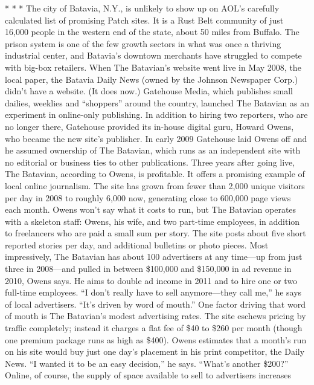 * * *
The city of Batavia, N.Y., is unlikely to show up on AOL's carefully calculated
list of promising Patch sites. It is a Rust Belt community of just 16,000 people in
the western end of the state, about 50 miles from Buffalo. The prison system is
one of the few growth sectors in what was once a thriving industrial center, and
Batavia's downtown merchants have struggled to compete with big-box retailers.
When The Batavian's website went live in May 2008, the local paper, the
Batavia Daily News (owned by the Johnson Newspaper Corp.) didn't have a
website. (It does now.) Gatehouse Media, which publishes small dailies, weeklies
and ``shoppers'' around the country, launched The Batavian as an experiment in
online-only publishing. In addition to hiring two reporters, who are no longer
there, Gatehouse provided its in-house digital guru, Howard Owens, who became
the new site's publisher. In early 2009 Gatehouse laid Owens off and he
assumed ownership of The Batavian, which runs as an independent site with no
editorial or business ties to other publications.
Three years after going live, The Batavian, according to Owens, is profitable. It
offers a promising example of local online journalism. The site has grown from
fewer than 2,000 unique visitors per day in 2008 to roughly 6,000 now, generating
close to 600,000 page views each month. Owens won't say what it costs to
run, but The Batavian operates with a skeleton staff: Owens, his wife, and two
part-time employees, in addition to freelancers who are paid a small sum per
story. The site posts about five short reported stories per day, and additional bulletins
or photo pieces.
Most impressively, The Batavian has about 100 advertisers at any time—up
from just three in 2008—and pulled in between \$100,000 and \$150,000 in ad
revenue in 2010, Owens says. He aims to double ad income in 2011 and to hire
one or two full-time employees. ``I don't really have to sell anymore—they call
me,'' he says of local advertisers. ``It's driven by word of mouth.''
One factor driving that word of mouth is The Batavian's modest advertising
rates. The site eschews pricing by traffic completely; instead it charges a flat fee
of \$40 to \$260 per month (though one premium package runs as high as \$400).
Owens estimates that a month's run on his site would buy just one day's placement
in his print competitor, the Daily News. ``I wanted it to be an easy decision,''
he says. ``What's another \$200?''
Online, of course, the supply of space available to sell to advertisers increases
